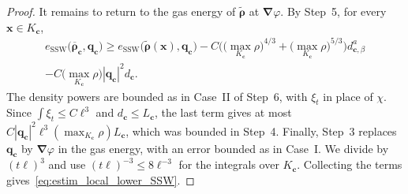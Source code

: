 \documentclass[final,reqno]{amsart}
\theoremstyle{remark}
\renewcommand{\le}{\leqslant}
\renewcommand{\ge}{\geqslant}
\newcommand{\ol}[1]{\overline{#1}}
\newcommand{\wt}[1]{\widetilde{#1}}
\newcommand{\SSW}{\mathrm{SSW}}
\newcommand{\grad}{\bm{\nabla}}
\begin{document}
\begin{proof}
It remains to return to the gas energy of $\wt{\bm{\rho}}$ at $\grad\varphi$. By Step~5, for every $\mathbf{x}\in K_{\mathbf{c}}$,
\begin{multline*}
e_\SSW\big(\ol{\bm{\rho}}_{\mathbf{c}},\mathbf{q}_{\mathbf{c}}\big)\ge e_\SSW\big(\wt{\bm{\rho}}(\mathbf{x}),\mathbf{q}_{\mathbf{c}}\big)-C\Big(\big(\max_{K_{\mathbf{c}}}\rho\big)^{4/3}+\big(\max_{K_{\mathbf{c}}}\rho\big)^{5/3}\Big)d_{\mathbf{c},\beta}^a\\
-C\Big(\max_{K_{\mathbf{c}}}\rho\Big)|\mathbf{q}_{\mathbf{c}}|^2d_{\mathbf{c}}.
\end{multline*}
The density powers are bounded as in Case~II of Step~6, with $\xi_t$ in place of $\chi$. Since $\int\xi_t\le C\ell^3$ and $d_{\mathbf{c}}\le L_{\mathbf{c}}$, the last term gives at most $C|\mathbf{q}_{\mathbf{c}}|^2\ell^3(\max_{K_{\mathbf{c}}}\rho)L_{\mathbf{c}}$, which was bounded in Step~4. Finally, Step~3 replaces $\mathbf{q}_{\mathbf{c}}$ by $\grad\varphi$ in the gas energy, with an error bounded as in Case~I. We divide by $(t\ell)^3$ and use $(t\ell)^{-3}\le8\ell^{-3}$ for the integrals over $K_{\mathbf{c}}$. Collecting the terms gives~\cref{eq:estim_local_lower_SSW}.
\end{proof}
\end{document}
